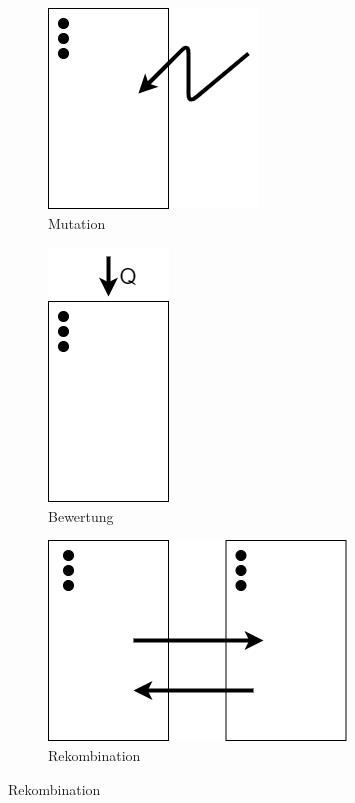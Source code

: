 \begin{figure}[!htb]
\begin{subfigure}{.3\textwidth}
	\centering
	\includegraphics[width=.7\linewidth]{img/rechenberg_notation/mutation.png}
	\caption{Mutation}
	\label{fig:mutation}
\end{subfigure}
\begin{subfigure}{.3\textwidth}
	\centering
	\includegraphics[width=.4\linewidth]{img/rechenberg_notation/bewertung.png}
	\caption{Bewertung}
	\label{fig:bewertung}
\end{subfigure}
\begin{subfigure}{.3\textwidth}
	\centering
	\includegraphics[width=.7\linewidth]{img/rechenberg_notation/rekombination.png}
	\caption{Rekombination}
	\label{fig:rekombination}
\end{subfigure}


\end{figure}
